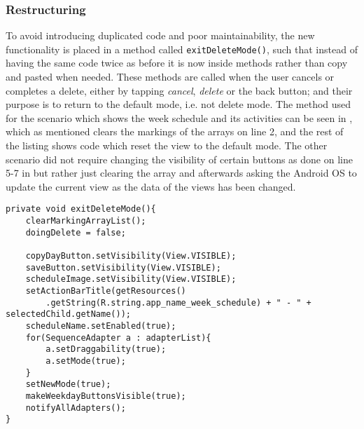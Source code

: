 \subsubsection{Restructuring}
To avoid introducing duplicated code and poor maintainability, the new functionality is placed in a method called \texttt{exitDeleteMode()}, such that instead of having the same code twice as before it is now inside methods rather than copy and pasted when needed.
These methods are called when the user cancels or completes a delete, either by tapping \textit{cancel}, \textit{delete} or the back button;
and their purpose is to return to the default mode, i.e. not delete mode.
The method used for the scenario which shows the week schedule and its activities can be seen in , which as mentioned clears the markings of the arrays on line 2, and the rest of the listing shows code which reset the view to the default mode.
The other scenario did not require changing the visibility of certain buttons as done on line 5-7 in  but rather just clearing the array and afterwards asking the Android OS to update the current view as the data of the views has been changed.

\begin{lstlisting}[caption={The \texttt{exitDeleteMode()} method, which returns the application to the default mode.}, label={lst:exitdeletemode}]
private void exitDeleteMode(){
    clearMarkingArrayList();
    doingDelete = false;

    copyDayButton.setVisibility(View.VISIBLE);
    saveButton.setVisibility(View.VISIBLE);
    scheduleImage.setVisibility(View.VISIBLE);
    setActionBarTitle(getResources()
        .getString(R.string.app_name_week_schedule) + " - " + selectedChild.getName());
    scheduleName.setEnabled(true);
    for(SequenceAdapter a : adapterList){
        a.setDraggability(true);
        a.setMode(true);
    }
    setNewMode(true);
    makeWeekdayButtonsVisible(true);
    notifyAllAdapters();
}
\end{lstlisting}
